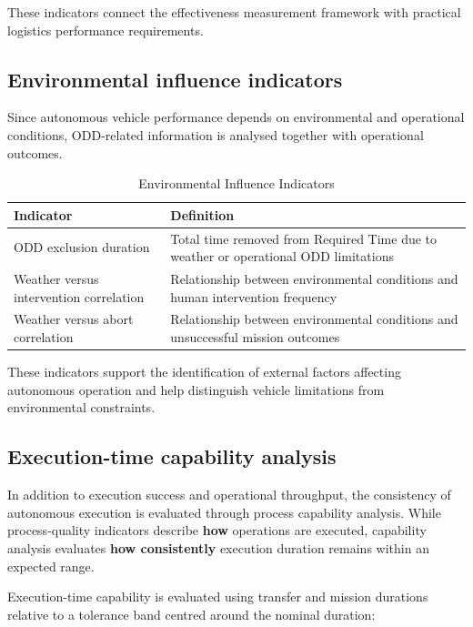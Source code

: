 These indicators connect the effectiveness measurement framework with practical logistics performance requirements.

\subsection{Environmental influence indicators}

Since autonomous vehicle performance depends on environmental and operational conditions, ODD-related information is analysed together with operational outcomes.

\begin{table}[H]
\small
\renewcommand{\arraystretch}{1.4}
\centering
\caption{Environmental Influence Indicators}
\label{tab:environmental-influence-indicators}
\begin{tabular}{|p{6.0cm}|p{9.0cm}|}
\hline
\textbf{Indicator} & \textbf{Definition} \\
\hline
ODD exclusion duration & Total time removed from Required Time due to weather or operational ODD limitations \\
\hline
Weather versus intervention correlation & Relationship between environmental conditions and human intervention frequency \\
\hline
Weather versus abort correlation & Relationship between environmental conditions and unsuccessful mission outcomes \\
\hline
\end{tabular}
\end{table}

These indicators support the identification of external factors affecting autonomous operation and help distinguish vehicle limitations from environmental constraints.

\subsection{Execution-time capability analysis}
\label{subsec:execution-time-capability-analysis}

In addition to execution success and operational throughput, the consistency of autonomous execution is evaluated through process capability analysis. While process-quality indicators describe \textbf{how} operations are executed, capability analysis evaluates \textbf{how consistently} execution duration remains within an expected range.

Execution-time capability is evaluated using transfer and mission durations relative to a tolerance band centred around the nominal duration:

